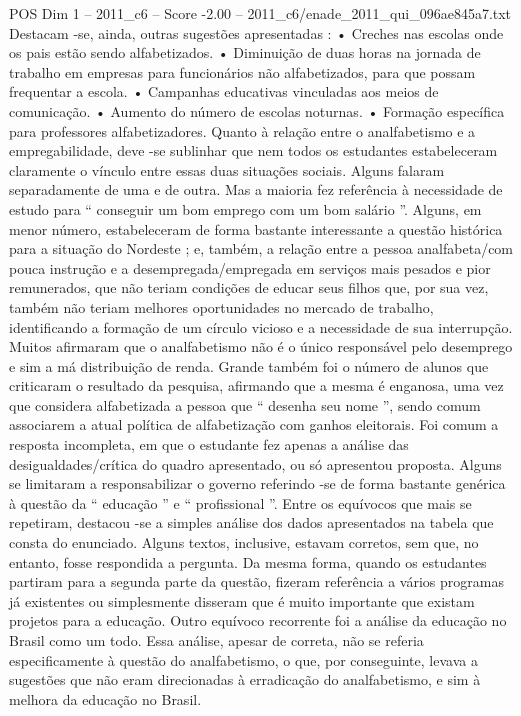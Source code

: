 \begin{textsample}{POS Dim 1 – 2011\_c6 – Score -2.00 – 2011\_c6/enade\_2011\_qui\_096ae845a7.txt}
Destacam -se, ainda, outras sugestões apresentadas : • Creches nas escolas onde os pais estão sendo alfabetizados. • Diminuição de duas horas na jornada de trabalho em empresas para funcionários não alfabetizados, para que possam frequentar a escola. • Campanhas educativas vinculadas aos meios de comunicação. • Aumento do número de escolas noturnas. • Formação específica para professores alfabetizadores.
Quanto à relação entre o analfabetismo e a empregabilidade, deve -se sublinhar que nem todos os estudantes estabeleceram claramente o vínculo entre essas duas situações sociais.
Alguns falaram separadamente de uma e de outra.
Mas a maioria fez referência à necessidade de estudo para “ conseguir um bom emprego com um bom salário ”.
Alguns, em menor número, estabeleceram de forma bastante interessante a questão histórica para a situação do Nordeste ; e, também, a relação entre a pessoa analfabeta/com pouca instrução e a desempregada/empregada em serviços mais pesados e pior remunerados, que não teriam condições de educar seus filhos que, por sua vez, também não teriam melhores oportunidades no mercado de trabalho, identificando a formação de um círculo vicioso e a necessidade de sua interrupção.
Muitos afirmaram que o analfabetismo não é o único responsável pelo desemprego e sim a má distribuição de renda.
Grande também foi o número de alunos que criticaram o resultado da pesquisa, afirmando que a mesma é enganosa, uma vez que considera alfabetizada a pessoa que “ desenha seu nome ”, sendo comum associarem a atual política de alfabetização com ganhos eleitorais.
Foi comum a resposta incompleta, em que o estudante fez apenas a análise das desigualdades/crítica do quadro apresentado, ou só apresentou proposta.
Alguns se limitaram a responsabilizar o governo referindo -se de forma bastante genérica à questão da “ educação ” e “ profissional ”.
Entre os equívocos que mais se repetiram, destacou -se a simples análise dos dados apresentados na tabela que consta do enunciado.
Alguns textos, inclusive, estavam corretos, sem que, no entanto, fosse respondida a pergunta.
Da mesma forma, quando os estudantes partiram para a segunda parte da questão, fizeram referência a vários programas já existentes ou simplesmente disseram que é muito importante que existam projetos para a educação.
Outro equívoco recorrente foi a análise da educação no Brasil como um todo.
Essa análise, apesar de correta, não se referia especificamente à questão do analfabetismo, o que, por conseguinte, levava a sugestões que não eram direcionadas à erradicação do analfabetismo, e sim à melhora da educação no Brasil.

\end{textsample}
